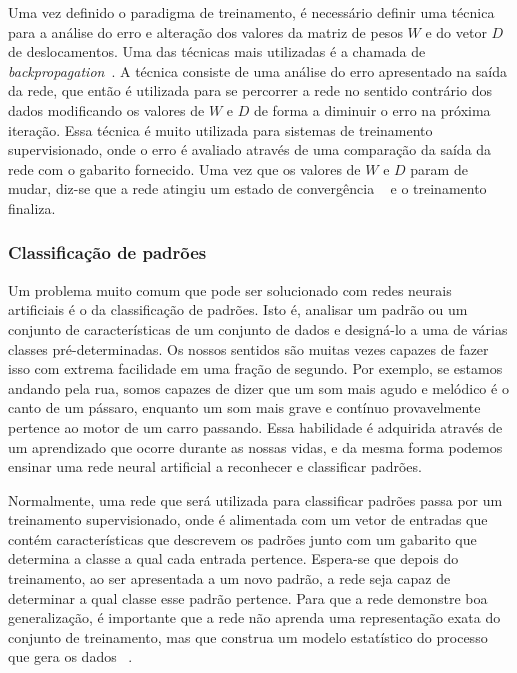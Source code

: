 Uma vez definido o paradigma de treinamento, é necessário definir uma técnica para a análise do erro e alteração dos valores da matriz de pesos $W$ e do vetor $D$ de deslocamentos. Uma das técnicas mais utilizadas é a chamada de \textit{backpropagation}~\cite{DeepLearning, ZhangNNSurvey}. A técnica consiste de uma análise do erro apresentado na saída da rede, que então é utilizada para se percorrer a rede no sentido contrário dos dados modificando os valores de $W$ e $D$ de forma a diminuir o erro na próxima iteração. Essa técnica é muito utilizada para sistemas de treinamento supervisionado, onde o erro é avaliado através de uma comparação da saída da rede com o gabarito fornecido. Uma vez que os valores de $W$ e $D$ param de mudar, diz-se que a rede atingiu um estado de convergência ~\cite{Kosabov} e o treinamento finaliza.


\subsubsection{Classificação de padrões}

Um problema muito comum que pode ser solucionado com redes neurais artificiais é o da classificação de padrões. Isto é, analisar um padrão ou um conjunto de características de um conjunto de dados e designá-lo a uma de várias classes pré-determinadas. Os nossos sentidos são muitas vezes capazes de fazer isso com extrema facilidade em uma fração de segundo. Por exemplo, se estamos andando pela rua, somos capazes de dizer que um som mais agudo e melódico é o canto de um pássaro, enquanto um som mais grave e contínuo provavelmente pertence ao motor de um carro passando. Essa habilidade é adquirida através de um aprendizado que ocorre durante as nossas vidas, e da mesma forma podemos ensinar uma rede neural artificial a reconhecer e classificar padrões.

Normalmente, uma rede que será utilizada para classificar padrões passa por um treinamento supervisionado, onde é alimentada com um vetor de entradas que contém características que descrevem os padrões junto com um gabarito que determina a classe a qual cada entrada pertence. Espera-se que depois do treinamento, ao ser apresentada a um novo padrão, a rede seja capaz de determinar a qual classe esse padrão pertence. Para que a rede demonstre boa generalização, é importante que a rede não aprenda uma representação exata do conjunto de treinamento, mas que construa um modelo estatístico do processo que gera os dados ~\cite{NNForPR}.

